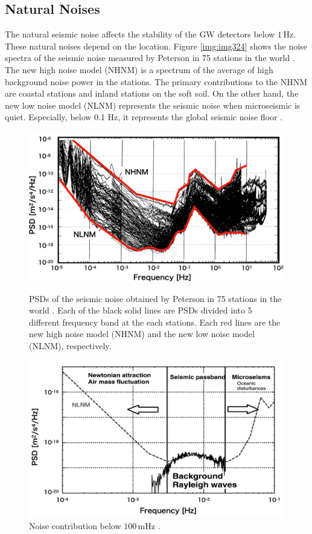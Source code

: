 \subsection{Natural Noises} \label{sec:322}
The natural seismic noise affects the stability of the GW detectors below $1\,\mathrm{Hz}$. These natural noises depend on the location. Figure \ref{img:img324} shows the noise spectra of the seismic noise measured by Peterson in 75 stations in the world \cite{peterson1993observations}. The new high noise model (NHNM) is a spectrum of the average of high background noise power in the stations. The primary contributions to the NHNM are coastal stations and inland stations on the soft soil. On the other hand, the new low noise model (NLNM) represents the seismic noise when microseismic is quiet. Especially, below 0.1 Hz, it represents the global seismic noise floor \cite{nishida2002origin}. 

\begin{figure}[p]
  \begin{center}   
    \includegraphics[width=12.5cm]{./img_chap3/img324.png}
    \caption{PSDs of the seismic noise obtained by Peterson in 75 stations in the world \cite{peterson1993observations}. Each of the black solid lines are PSDs divided into 5 different frequency band at the each stations. Each red lines are the new high noise model (NHNM) and the new low noise model (NLNM), respectively.}\label{img:img324}
  \end{center}
  \begin{center}   
    \includegraphics[width=13cm]{./img_chap3/img325.png}
    \caption{Noise contribution below $100\,\mathrm{mHz}$ \cite{nishida2002origin}. }\label{img:img325}
  \end{center} 
\end{figure}



